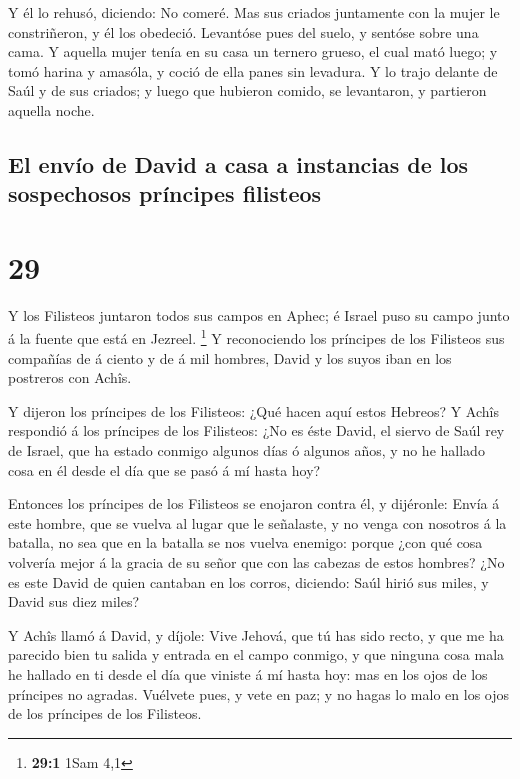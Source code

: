  Y él lo rehusó, diciendo: No comeré. Mas sus criados
juntamente con la mujer le constriñeron, y él los obedeció. Levantóse
pues del suelo, y sentóse sobre una cama.  Y aquella mujer
tenía en su casa un ternero grueso, el cual mató luego; y tomó harina y
amasóla, y coció de ella panes sin levadura.  Y lo trajo
delante de Saúl y de sus criados; y luego que hubieron comido, se
levantaron, y partieron aquella noche.

\hypertarget{el-envuxedo-de-david-a-casa-a-instancias-de-los-sospechosos-pruxedncipes-filisteos}{%
\subsection{El envío de David a casa a instancias de los sospechosos
príncipes
filisteos}\label{el-envuxedo-de-david-a-casa-a-instancias-de-los-sospechosos-pruxedncipes-filisteos}}

\hypertarget{section-28}{%
\section{29}\label{section-28}}

 Y los Filisteos juntaron todos sus campos en Aphec; é
Israel puso su campo junto á la fuente que está en Jezreel. \footnote{\textbf{29:1}
  1Sam 4,1}  Y reconociendo los príncipes de los Filisteos
sus compañías de á ciento y de á mil hombres, David y los suyos iban en
los postreros con Achîs.

 Y dijeron los príncipes de los Filisteos: ¿Qué hacen aquí
estos Hebreos? Y Achîs respondió á los príncipes de los Filisteos: ¿No
es éste David, el siervo de Saúl rey de Israel, que ha estado conmigo
algunos días ó algunos años, y no he hallado cosa en él desde el día que
se pasó á mí hasta hoy?

 Entonces los príncipes de los Filisteos se enojaron contra
él, y dijéronle: Envía á este hombre, que se vuelva al lugar que le
señalaste, y no venga con nosotros á la batalla, no sea que en la
batalla se nos vuelva enemigo: porque ¿con qué cosa volvería mejor á la
gracia de su señor que con las cabezas de estos hombres? 
¿No es este David de quien cantaban en los corros, diciendo: Saúl hirió
sus miles, y David sus diez miles?

 Y Achîs llamó á David, y díjole: Vive Jehová, que tú has
sido recto, y que me ha parecido bien tu salida y entrada en el campo
conmigo, y que ninguna cosa mala he hallado en ti desde el día que
viniste á mí hasta hoy: mas en los ojos de los príncipes no agradas.
 Vuélvete pues, y vete en paz; y no hagas lo malo en los
ojos de los príncipes de los Filisteos.

